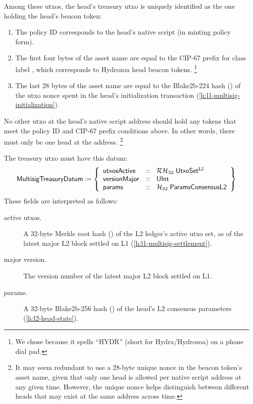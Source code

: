 \documentclass[../hydrozoa.tex]{subfiles}
\begin{document}
Among these utxos, the head's treasury utxo is uniquely identified as the one holding the head's beacon token:
\begin{enumerate}
  \item The policy ID corresponds to the head's native script (in minting policy form).
  \item The first four bytes of the asset name are equal to the CIP-67
    \citep{AlessandroKonradThomasVellekoopCIP67AssetName2022}
    prefix for class label \headBeaconToken{}, which corresponds to Hydrozoa head beacon tokens.%
    \footnote{We chose \headBeaconToken{} because it spells ``HYDR'' (short for Hydra/Hydrozoa) on a phone dial pad.}
  \item The last 28 bytes of the asset name are equal to the Blake2b-224 hash () of the utxo nonce spent in the head's initialization transaction (\cref{h:l1-multisig-initialization}).
\end{enumerate}
No other utxo at the head's native script address should hold any tokens that meet the policy ID and CIP-67 prefix conditions above.
In other words, there must only be one head at the address.%
\footnote{It may seem redundant to use a 28-byte unique nonce in the beacon token's asset name, given that only one head is allowed per native script address at any given time.
  However, the unique nonce helps distinguish between different heads that may exist at the same address across time.}

The treasury utxo must have this datum:
\begin{equation*}
  \mathsf{MultisigTreasuryDatum} \coloneq \left\{
    \begin{array}{lll}
      \mathsf{utxosActive}  &::& \mathcal{RH}_{32} \; \mathsf{UtxoSet^{L2}} \\
      \mathsf{versionMajor} &::& \mathsf{UInt} \\
      \mathsf{params} &::& \mathcal{H}_{32} \; \mathsf{ParamsConsensusL2}
    \end{array}\right\}
\end{equation*}
These fields are interpreted as follows:
\begin{description}
  \item[active utxos.] A 32-byte Merkle root hash () of the L2 ledger's active utxo set, as of the latest major L2 block settled on L1 (\cref{h:l1-multisig-settlement}).
  \item[major version.] The version number of the latest major L2 block settled on L1.
  \item[params.] A 32-byte Blake2b-256 hash () of the head's L2 consensus parameters (\cref{h:l2-head-state}).
\end{description}
\end{document}
